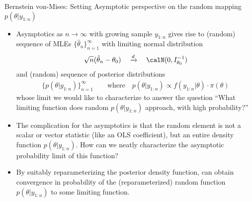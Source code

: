 \documentclass[aspectratio=169, handout]{beamer}
\newcommand{\ra}{\rightarrow}
\newcommand{\dto}{\xrightarrow{d}}
\begin{document}
{\footnotesize
\begin{frame}{Bernstein von-Mises: Setting}
\alert{Asymptotic} perspective on the random mapping $p(\theta|y_{1:n})$
\begin{itemize}
  \item
    Asymptotics as $n\ra\infty$ with growing sample $y_{1:n}$ gives rise
    to (random) sequence of \alert{MLEs}
    $\{\hat{\theta}_n\}_{n=1}^\infty$ with limiting normal distribution
    \begin{align*}
      \sqrt{n}(\hat{\theta}_n-\theta_0)
      \quad\dto\quad
      \calN(0,I_{\theta_0}^{-1})
    \end{align*}
    and (random) sequence of \alert{posterior distributions}
    \begin{align*}
      \{
      p(\theta|y_{1:n})
      \}_{n=1}^\infty
      \qquad\text{where}\quad
      p(\theta|y_{1:n})
      \propto
      f(y_{1:n}|\theta)\cdot \pi(\theta)
    \end{align*}
    whose limit we would like to characterize to answer the question
    ``What limiting function does random $p(\theta|y_{1:n})$ approach,
    with high probability?''

  \item The complication for the asymptotics is that the random element
    is not a scalar or vector statistic (like an OLS coefficient), but
    an entire density function $p(\theta|y_{1:n})$.
    How can we neatly characterize the asymptotic probability limit of
    this function?

  \item
    By suitably \alert{reparameterizing} the posterior density function,
    can obtain \alert{convergence in probability}
    of the (reparameterized) random function $p(\theta|y_{1:n})$ to some
    limiting function.
\end{itemize}
\end{frame}
}
\end{document}
